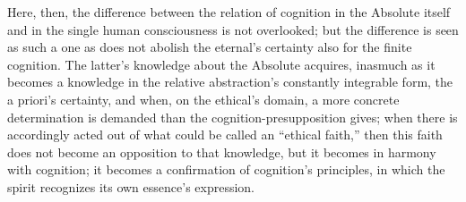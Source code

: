 \documentclass[12pt,a4paper]{book}
\begin{document}
Here, then, the difference between the relation of cognition in the Absolute itself and in the single
human consciousness is not overlooked; but the difference is seen as such a one as does not abolish the
eternal's certainty also for the finite cognition. The latter's knowledge about the Absolute acquires,
inasmuch as it becomes a knowledge in the relative abstraction's constantly integrable form, the a
priori's certainty, and when, on the ethical's domain, a more concrete determination is demanded than
the cognition-presupposition gives; when there is accordingly acted out of what could be called an
``ethical faith,'' then this faith does not become an opposition to that knowledge, but it becomes in
harmony with cognition; it becomes a confirmation of cognition's principles, in which the spirit
recognizes its own essence's expression.
\end{document}

